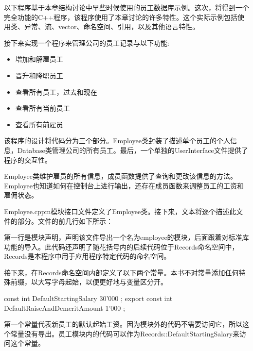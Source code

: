 
以下程序基于本章结构讨论中早些时候使用的员工数据库示例。这次，将得到一个完全功能的C++程序，该程序使用了本章讨论的许多特性。这个实际示例包括使用类、异常、流、vector、命名空间、引用，以及其他语言特性。


接下来实现一个程序来管理公司的员工记录与以下功能:

\begin{itemize}
\item
增加和解雇员工

\item
晋升和降职员工

\item
查看所有员工，过去和现在

\item
查看所有当前员工

\item
查看所有前雇员
\end{itemize}

该程序的设计将代码分为三个部分。Employee类封装了描述单个员工的个人信息，Database类管理公司的所有员工。最后，一个单独的UserInterface文件提供了程序的交互性。


Employee类维护雇员的所有信息，成员函数提供了查询和更改该信息的方法。Employee也知道如何在控制台上进行输出，还存在成员函数来调整员工的工资和雇佣状态。


Employee.cppm模块接口文件定义了Employee类。接下来，文本将逐个描述此文件的部分。文件的前几行如下所示：

\begin{cpp}
export module employee;
import std;
namespace Records {
\end{cpp}

第一行是模块声明，声明该文件导出一个名为employee的模块，后面跟着对标准库功能的导入。此代码还声明了随花括号内的后续代码位于Records命名空间中，Records是本程序中用于应用程序特定代码的命名空间。

接下来，在Records命名空间内部定义了以下两个常量。本书不对常量添加任何特殊前缀，以大写字母起始，以便更好地与变量区分开。

\begin{cpp}
const int DefaultStartingSalary { 30'000 };
export const int DefaultRaiseAndDemeritAmount { 1'000 };
\end{cpp}

第一个常量代表新员工的默认起始工资。因为模块外的代码不需要访问它，所以这个常量没有导出。员工模块内的代码可以作为Records::DefaultStartingSalary来访问这个常量。


